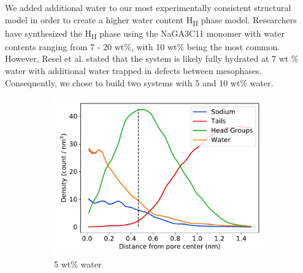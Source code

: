 \documentclass{article}
\begin{document}
  We added additional water to our most experimentally consistent structural
  model in order to create a higher water content H\textsubscript{II} phase
  model. Researchers have synthesized the H\textsubscript{II} phase using 
  the NaGA3C11 monomer with water contents ranging from 7 - 20 wt\%, with 
  10 wt\% being the most common.~\cite{smith_ordered_1997,zhou_supported_2005} 
  However, Resel et al. stated that the system is likely fully hydrated at
  7 wt \% water with additional water trapped in defects between mesophases.~\cite{resel_structural_2000}
  Consequently, we chose to build two systems with 5 and 10 wt\% water.
  
  \begin{figure}
  \centering
  \vspace{-0.4cm}
  \begin{subfigure}{0.49\linewidth}
  \includegraphics[width=\linewidth]{component_density_5wt.pdf}
  \caption{5 wt\% water}\label{fig:component_density_5wt}
  \end{subfigure}
  \begin{subfigure}{0.49\linewidth}

\end{subfigure}
\end{figure}
\end{document}
